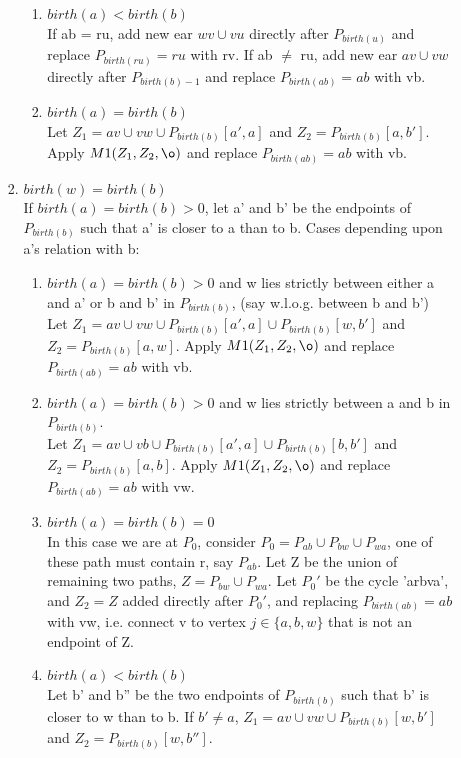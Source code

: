 \begin{lem}
\begin{enumerate}
\begin{enumerate}
\begin{enumerate}
			\begin{enumerate}
			\item $birth(a) < birth(b)$ \\
			If ab = ru, add new ear $wv \cup vu$ directly after $P_{birth(u)}$ and replace $P_{birth(ru)} = ru$ with rv.
			If ab $\neq$ ru, add new ear $av \cup vw$ directly after $P_{birth(b)-1}$ and replace $P_{birth(ab)} = ab$ with vb.
			\item $birth(a) = birth(b)$ \\
			Let $Z_1 = av \cup vw \cup P_{birth(b)}[a',a]$ and $Z_2 = P_{birth(b)}[a,b']$. Apply $M1(Z_1,Z_2,\o)$ and replace $P_{birth(ab)} = ab$ with vb.
			\end{enumerate}
		\item $birth(w) = birth(b)$ \\
		If $birth(a) = birth(b) > 0$, let a' and b' be the endpoints of $P_{birth(b)}$ such that a' is closer to a than to b.
		Cases depending upon a's relation with b:
			\begin{enumerate}
			\item $birth(a) = birth(b) > 0$ and w lies strictly between either a and a' or b and b' in $P_{birth(b)}$, (say w.l.o.g. between b and b') \\
			Let $Z_1 = av \cup vw \cup P_{birth(b)}[a',a] \cup P_{birth(b)}[w,b'] $ and $Z_2 = P_{birth(b)}[a,w]$.
			Apply $M1(Z_1,Z_2,\o)$ and replace $P_{birth(ab)} = ab$ with vb.
			\item $birth(a) = birth(b) > 0$ and w lies strictly between a and b in $P_{birth(b)}$.\\
			Let $Z_1 = av \cup vb \cup P_{birth(b)}[a',a] \cup P_{birth(b)}[b,b'] $ and $Z_2 = P_{birth(b)}[a,b]$.
			Apply $M1(Z_1,Z_2,\o)$ and replace $P_{birth(ab)} = ab$ with vw.
			\item $birth(a) = birth(b) = 0$ \\
			In this case we are at $P_0$, consider $P_0 = P_{ab} \cup P_{bw} \cup P_{wa}$, one of these path must contain r, say $P_{ab}$.
			Let Z be the union of remaining two paths, $Z = P_{bw} \cup P_{wa}$.
			Let $P_0'$ be the cycle 'arbva', and $Z_2 = Z$ added directly after $P_0'$, and replacing $P_{birth(ab)} = ab$ with vw, i.e. connect v to vertex $j \in \{a,b,w\}$ that is not an endpoint of Z.
			\item $birth(a) < birth(b)$ \\
			Let b' and b'' be the two endpoints of $P_{birth(b)}$ such that b' is closer to w than to b.
			If $b' \neq a$, $Z_1 = av \cup vw \cup P_{birth(b)}[w,b']$ and $Z_2 = P_{birth(b)}[w,b'']$.

\end{enumerate}
\end{enumerate}
\end{enumerate}
\end{enumerate}
\end{lem}
